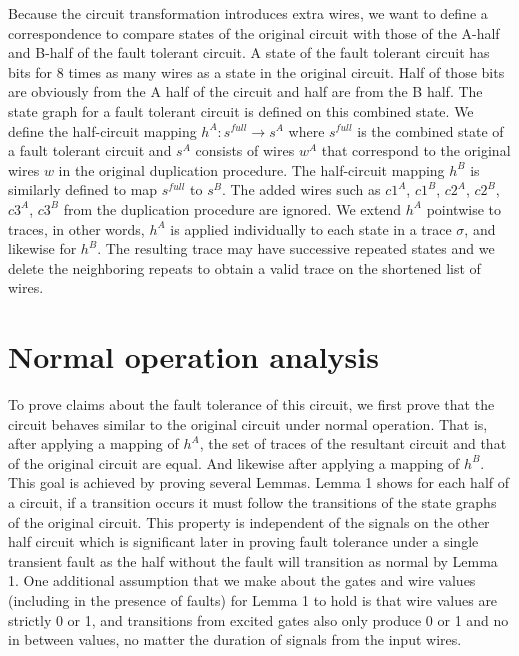 \documentclass[12pt]{report}
\begin{document}
Because the circuit transformation introduces extra wires, we want to define a correspondence to compare states of the original circuit with those of the A-half and B-half of the fault tolerant circuit.  A state of the fault tolerant circuit has bits for 8 times as many wires as a state in the original circuit.  Half of those bits are obviously from the A half of the circuit and half are from the B half.  The state graph for a fault tolerant circuit is defined on this combined state.  We define the half-circuit mapping $h^A: s^{\mathit{full}} \to s^A$ where $s^{\mathit{full}}$ is the combined state of a fault tolerant circuit and $s^A$ consists of wires $w^A$ that correspond to the original wires $w$ in the original duplication procedure.  The half-circuit mapping $h^B$ is similarly defined to map $s^{\mathit{full}}$ to $s^B$.  The added wires such as $c1^A$, $c1^B$, $c2^A$, $c2^B$, $c3^A$, $c3^B$ from the duplication procedure are ignored.  We extend $h^A$ pointwise to traces, in other words, $h^A$ is applied individually to each state in a trace $\sigma$, and likewise for $h^B$.  %
The resulting trace may have successive repeated states and we delete the neighboring repeats to obtain a valid trace on the shortened list of wires.  %
\\

\section{Normal operation analysis}
To prove claims about the fault tolerance of this circuit, we first prove that the circuit behaves similar to the original circuit under normal operation.  That is, after applying a mapping of $h^A$, the set of traces of the resultant circuit and that of the original circuit are equal.  And likewise after applying a mapping of $h^B$.  This goal is achieved by proving several Lemmas. Lemma 1 shows for each half of a circuit, if a transition occurs it must follow the transitions of the state graphs of the original circuit.  This property is independent of the signals on the other half circuit which is significant later in proving fault tolerance under a single transient fault as the half without the fault will transition as normal by Lemma 1.  %
One additional assumption that we make about the gates and wire values (including in the presence of faults) for Lemma 1 to hold is that wire values are strictly 0 or 1, and transitions from excited gates also only produce 0 or 1 and no in between values, no matter the duration of signals from the input wires.\\
\end{document}

